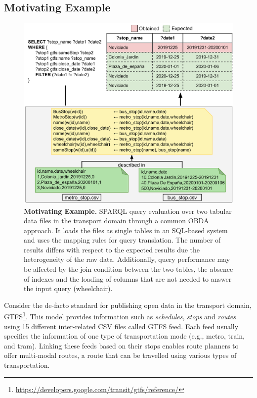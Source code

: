 \subsection{Motivating Example}
\begin{figure}[ht]
    \centering
    \includegraphics[width=0.6\linewidth]{figures/example.pdf}
    \caption[Morph-CSV motivating example]{\textbf{Motivating Example.} SPARQL query evaluation over two tabular data files in the transport domain through a common OBDA approach. It loads the files as single tables in an SQL-based system and uses the mapping rules for query translation. The number of results differs with respect to the expected results due the heterogeneity of the raw data. Additionally, query performance may be affected by the join condition between the two tables, the absence of indexes and the loading of columns that are not needed to answer the input query (wheelchair).}
    \label{fig:example}
\end{figure}
Consider the de-facto standard for publishing open data in the transport domain, GTFS\footnote{\url{https://developers.google.com/transit/gtfs/reference/}}. This model provides information such as \textit{schedules}, \textit{stops} and \textit{routes} using 15 different inter-related CSV files called GTFS feed. Each feed usually specifies the information of one type of transportation mode (e.g., metro, train, and tram). Linking these feeds based on their stops enables route planners to offer multi-modal routes, a route that can be travelled using various types of transportation.

